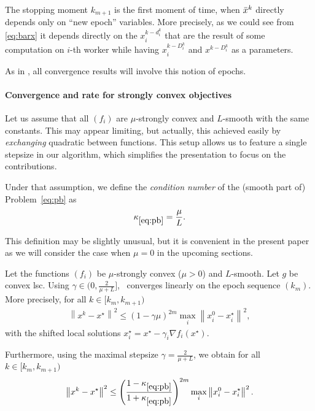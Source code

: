 The stopping moment $k_{m+1}$ is the first moment of time, when $\bar{x}^k$ directly depends only on ``new epoch'' variables. More precisely, as we could see from \eqref{eq:barx} it depends directly on the $x_i^{k-d_i^k}$ that are the result of some computation on $i$-th worker while having $x_i^{k-D_i^k}$ and $x^{k-D_i^k}$ as a parameters.

As in \cite{mishchenko2019distributed}, all convergence results will involve this notion of epochs.


\paragraph{Convergence and rate for strongly convex objectives}

Let us assume that all $(f_i)$ are $\mu$-strongly convex and $L$-smooth with the same constants. This may appear limiting, but actually, this achieved easily by \emph{exchanging} quadratic between functions. This setup allows us to feature a single stepsize in our algorithm, which simplifies the presentation to focus on the contributions.

Under that assumption, we define the \emph{condition number} of the (smooth part of) Problem~\eqref{eq:pb} as 
$$\kappa_{\eqref{eq:pb}} = \frac{\mu}{L}.$$

This definition may be slightly unusual, but it is convenient in the present paper as we will consider the case when $\mu=0$ in the upcoming sections. 


\begin{theorem} \label{th:davepg}
Let the functions $(f_i)$ be $\mu$-strongly convex ($\mu>0$) and $L$-smooth. Let $g$ be convex lsc. Using $\gamma \in (0, \frac{2}{\mu + L}]$, \dave~converges linearly on the epoch sequence $(k_m)$. More precisely, for all $k\in [k_m, k_{m+1})$
\begin{align*}
    \left\| x^k - x^\star \right\|^2 \le \left(1 - \gamma \mu  \right)^{2m} \max_i\left\|x_i^0-x_i^\star\right\|^2,
\end{align*}
with the shifted local solutions $x_i^\star = x^\star - \gamma_i\nabla f_i(x^\star)$. 

Furthermore, using the maximal stepsize $\gamma = \frac{2}{\mu + L}$, we obtain for all $k\in [k_m, k_{m+1})$
\begin{align*}
    \left\| x^k - x^\star \right\|^2 \le \left( \frac{1-\kappa_{\eqref{eq:pb}}}{1+\kappa_{\eqref{eq:pb}}}  \right)^{2m} \max_i\left\|x_i^0-x_i^\star\right\|^2.
\end{align*}
\end{theorem}


